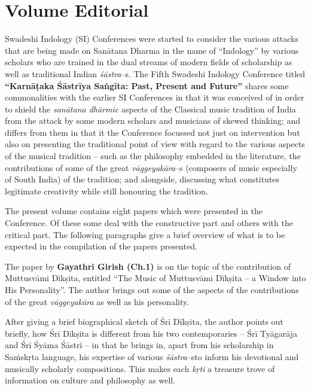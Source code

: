 
\chapter*{Volume Editorial}\label{volumeeditorial}

Swadeshi Indology (SI) Conferences were started to consider the various attacks that are being made on Sanātana Dharma in the name of “Indology” by various scholars who are trained in the dual streams of modern fields of scholarship as well as traditional Indian \textit{śāstra}–s. The Fifth Swadeshi Indology Conference titled \textbf{“Karnāṭaka Śāstrīya Saṅgīta: Past, Present and Future”} shares some commonalities with the earlier SI Conferences in that it was conceived of in order to shield the \textit{sanātana dhārmic} aspects of the Classical music tradition of India from the attack by some modern scholars and musicians of skewed thinking; and differs from them in that it the Conference focussed not just on intervention but also on presenting the traditional point of view with regard to the various aspects of the musical tradition – such as the philosophy embedded in the literature, the contributions of some of the great \textit{vāggeyakāra}–s (composers of music especially of South India) of the tradition; and alongside, discussing what constitutes legitimate creativity while still honouring the tradition.

The present volume contains eight papers which were presented in the Conference. Of these some deal with the constructive part and others with the critical part. The following paragraphs give a brief overview of what is to be expected in the compilation of the papers presented.

\delimiter

The paper by \textbf{Gayathri Girish (Ch.1)} is on the topic of the contribution of Muttusvāmi Dīkṣita, entitled “The Music of Muttusvāmi Dīkṣita – a Window into His Personality”. The author brings out some of the aspects of the contributions of the great \textit{vāggeyakāra} as well as his personality.

After giving a brief biographical sketch of Śrī Dīkṣita, the author points out briefly, how Śrī Dīkṣita is different from his two contemporaries – Śrī Tyāgarāja and Śrī Śyāma Śāstri – in that he brings in, apart from his scholarship in Saṁskṛta language, his expertise of various \textit{śāstra}–s\break to inform his devotional and musically scholarly compositions. This makes each \textit{kṛti} a treasure trove of information on culture and philosophy as well. 

